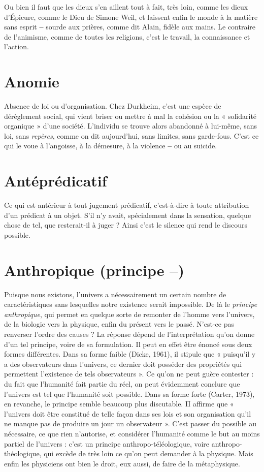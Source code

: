 Ou bien il faut que les dieux s’en aillent tout à fait, très loin, comme les
dieux d’Épicure, comme le Dieu de Simone Weil, et laissent enfin le monde à
la matière sans esprit {\bf --} sourde aux prières, comme dit Alain, fidèle aux mains.
Le contraire de l’animisme, comme de toutes les religions, c’est le travail, la
connaissance et l’action.

\section{Anomie}
Absence de loi ou d'organisation. Chez Durkheim, c’est une espèce
de dérèglement social, qui vient briser ou mettre à mal la cohésion
ou la « solidarité organique » d’une société. L’individu se trouve alors abandonné
à lui-même, sans loi, sans {\it repères}, comme on dit aujourd’hui, sans
limites, sans garde-fous. C’est ce qui le voue à l’angoisse, à la démesure, à la violence {\bf --}
ou au suicide.

\section{Antéprédicatif}
Ce qui est antérieur à tout jugement prédicatif, c’est-à-dire
à toute attribution d’un prédicat à un objet. S'il
n’y avait, spécialement dans la sensation, quelque chose de tel, que resterait-il à
juger ? Ainsi c’est le silence qui rend le discours possible.

\section{Anthropique (principe {\bf --})}
Puisque nous existons, l'univers a nécessairement
un certain nombre de caractéristiques
sans lesquelles notre existence serait impossible. De là le {\it principe anthropique},
qui permet en quelque sorte de remonter de l’homme vers l'univers, de
la biologie vers la physique, enfin du présent vers le passé. N'est-ce pas renverser
l’ordre des causes ? La réponse dépend de l'interprétation qu’on donne
d’un tel principe, voire de sa formulation. Il peut en effet être énoncé sous deux
formes différentes. Dans sa forme faible (Dicke, 1961), il stipule que « puisqu’il
y a des observateurs dans l’univers, ce dernier doit posséder des propriétés
qui permettent l'existence de tels observateurs ». Ce qu'on ne peut guère
contester : du fait que l'humanité fait partie du réel, on peut évidemment
conclure que l’univers est tel que l'humanité soit possible. Dans sa forme forte
(Carter, 1973), en revanche, le principe semble beaucoup plus discutable. II
affirme que « l'univers doit être constitué de telle façon dans ses lois et son
organisation qu’il ne manque pas de produire un jour un observateur ». C’est
passer du possible au nécessaire, ce que rien n’autorise, et considérer l'humanité
comme le but au moins partiel de l’univers : c’est un principe anthropo-téléologique,
voire anthropo-théologique, qui excède de très loin ce qu’on peut
demander à la physique. Mais enfin les physiciens ont bien le droit, eux aussi,
de faire de la métaphysique.

